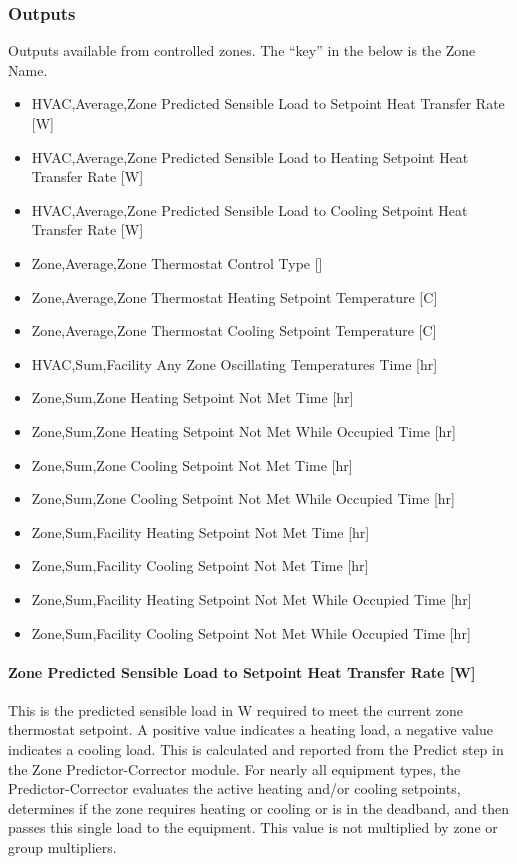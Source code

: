 \subsubsection{Outputs}\label{outputs-042}

Outputs available from controlled zones. The ``key'' in the below is the Zone Name.

\begin{itemize}
\item
  HVAC,Average,Zone Predicted Sensible Load to Setpoint Heat Transfer Rate {[}W{]}
\item
  HVAC,Average,Zone Predicted Sensible Load to Heating Setpoint Heat Transfer Rate {[}W{]}
\item
  HVAC,Average,Zone Predicted Sensible Load to Cooling Setpoint Heat Transfer Rate {[}W{]}
\item
  Zone,Average,Zone Thermostat Control Type {[]}
\item
  Zone,Average,Zone Thermostat Heating Setpoint Temperature {[}C{]}
\item
  Zone,Average,Zone Thermostat Cooling Setpoint Temperature {[}C{]}
\item
  HVAC,Sum,Facility Any Zone Oscillating Temperatures Time {[}hr{]}
\item
  Zone,Sum,Zone Heating Setpoint Not Met Time {[}hr{]}
\item
  Zone,Sum,Zone Heating Setpoint Not Met While Occupied Time {[}hr{]}
\item
  Zone,Sum,Zone Cooling Setpoint Not Met Time {[}hr{]}
\item
  Zone,Sum,Zone Cooling Setpoint Not Met While Occupied Time {[}hr{]}
\item
  Zone,Sum,Facility Heating Setpoint Not Met Time {[}hr{]}
\item
  Zone,Sum,Facility Cooling Setpoint Not Met Time {[}hr{]}
\item
  Zone,Sum,Facility Heating Setpoint Not Met While Occupied Time {[}hr{]}
\item
  Zone,Sum,Facility Cooling Setpoint Not Met While Occupied Time {[}hr{]}
\end{itemize}

\paragraph{Zone Predicted Sensible Load to Setpoint Heat Transfer Rate {[}W{]}}\label{zone-predicted-sensible-load-to-setpoint-heat-transfer-rate-w}

This is the predicted sensible load in W required to meet the current zone thermostat setpoint. A positive value indicates a heating load, a negative value indicates a cooling load. This is calculated and reported from the Predict step in the Zone Predictor-Corrector module. For nearly all equipment types, the Predictor-Corrector evaluates the active heating and/or cooling setpoints, determines if the zone requires heating or cooling or is in the deadband, and then passes this single load to the equipment. This value is not multiplied by zone or group multipliers.

